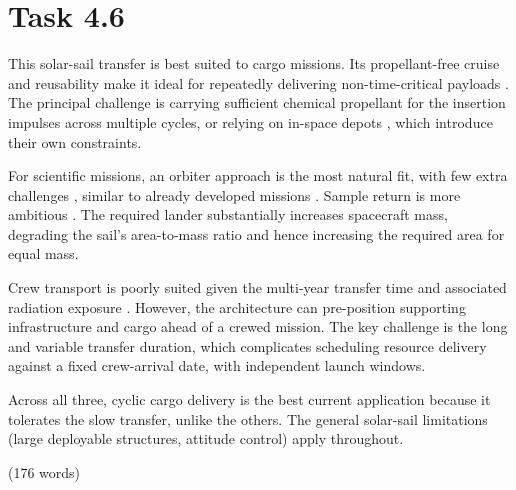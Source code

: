 \section{Task 4.6}

This solar-sail transfer is best suited to cargo missions. 
Its propellant-free cruise and reusability make it ideal for repeatedly delivering non-time-critical payloads \parencite{frisbee2002solar,rozhkov2023cyclic}. 
The principal challenge is carrying sufficient chemical propellant for the insertion impulses across multiple cycles, or relying on in-space depots \parencite{smitherman2011space}, which introduce their own constraints.

For scientific missions, an orbiter approach is the most natural fit, with few extra challenges \parencite[sec 6.4]{mcinnes1999book}, similar to already developed missions \parencite{lantoine2024trajectory}. 
Sample return is more ambitious \parencite[sec 6.5]{mcinnes1999book}. 
The required lander substantially increases spacecraft mass, degrading the sail's area-to-mass ratio and hence increasing the required area for equal mass.

Crew transport is poorly suited given the multi-year transfer time and associated radiation exposure \parencite{frisbee2002solar, nasa2023ScienceMars}. 
However, the architecture can pre-position supporting infrastructure and cargo ahead of a crewed mission. 
The key challenge is the long and variable transfer duration, which complicates scheduling resource delivery against a fixed crew-arrival date, with independent launch windows.

Across all three, cyclic cargo delivery is the best current application because it tolerates the slow transfer, unlike the others. The general solar-sail limitations (large deployable structures, attitude control) apply throughout.

(176 words)